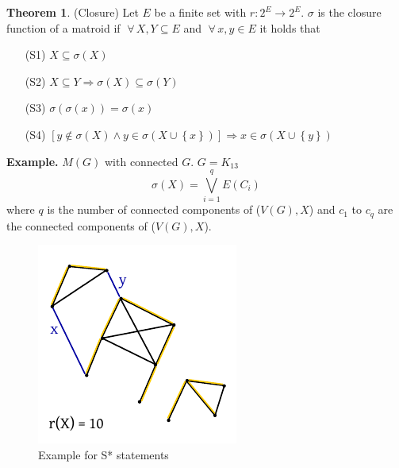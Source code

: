 \documentclass[a4paper]{article}
\theoremstyle{definition}
\newtheorem{theorem}{Theorem}
\newcommand{\set}[1]{\left\{#1\right\}}
\newcommand{\fall}{\;\forall\,}
\begin{document}
\begin{theorem}
  \label{satz-8.7}
  (Closure)
  Let $E$ be a finite set with $r: 2^E \rightarrow 2^E$.
  $\sigma$ is the closure function of a matroid if $\fall X, Y \subseteq E$ and $\fall x, y \in E$ it holds that
  \begin{itemize}
    \item[(S1)] $X \subseteq \sigma(X)$
    \item[(S2)] $X \subseteq Y \Rightarrow \sigma(X) \subseteq \sigma(Y)$
    \item[(S3)] $\sigma(\sigma(x)) = \sigma(x)$
    \item[(S4)] $[y \notin \sigma(X) \land y \in \sigma(X \cup \set{x})] \Rightarrow x \in \sigma(X \cup \set{y})$
  \end{itemize}
\end{theorem}

\textbf{Example.}
  $M(G)$ with connected $G$. $G = K_{13}$
  \[ \sigma(X) = \bigvee_{i=1}^q E(C_i) \]
  where $q$ is the number of connected components of ($V(G), X$) and $c_{1}$ to $c_{q}$ are the connected components of ($V(G), X$).

\begin{figure}[!ht]
  \begin{center}
    \includegraphics{img/s_statements_example.pdf}
    \caption{Example for S* statements}
  \end{center}
\end{figure}
\end{document}
